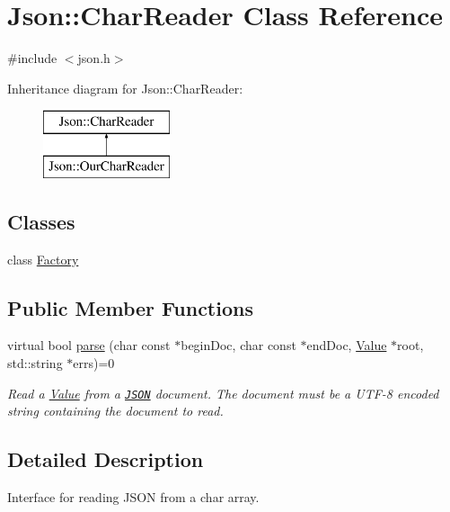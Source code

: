 \hypertarget{class_json_1_1_char_reader}{\section{Json\-:\-:Char\-Reader Class Reference}
\label{class_json_1_1_char_reader}
}


{\ttfamily \#include $<$json.\-h$>$}

Inheritance diagram for Json\-:\-:Char\-Reader\-:\begin{figure}[H]
\begin{center}
\leavevmode
\includegraphics[height=2.000000cm]{class_json_1_1_char_reader}
\end{center}
\end{figure}
\subsection*{Classes}
\begin{DoxyCompactItemize}
\item 
class \hyperlink{class_json_1_1_char_reader_1_1_factory}{Factory}
\end{DoxyCompactItemize}
\subsection*{Public Member Functions}
\begin{DoxyCompactItemize}
\item 
virtual bool \hyperlink{class_json_1_1_char_reader_a48e320be8b13bbc0960cc5808cafec98}{parse} (char const $\ast$begin\-Doc, char const $\ast$end\-Doc, \hyperlink{class_json_1_1_value}{Value} $\ast$root, std\-::string $\ast$errs)=0
\begin{DoxyCompactList}\small\item\em Read a \hyperlink{class_json_1_1_value}{Value} from a \href{http://www.json.org}{\tt J\-S\-O\-N} document. The document must be a U\-T\-F-\/8 encoded string containing the document to read. \end{DoxyCompactList}\end{DoxyCompactItemize}


\subsection{Detailed Description}
Interface for reading J\-S\-O\-N from a char array. 

